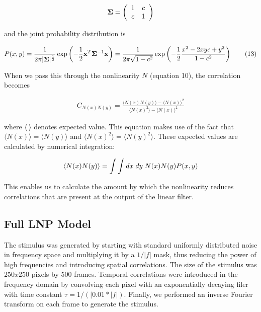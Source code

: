 \documentclass[12pt]{article}
\begin{document}
\[ {\bf\Sigma} = \left( \begin{array}{cc}
1 & c \\
c & 1 \\
\end{array} \right) \]

\noindent and the joint probability distribution is

\begin{align}
\displaystyle P(x,y) = \frac{1}{2\pi |{\bf \Sigma}|^{\frac{1}{2}}}\exp\left( -\frac{1}{2}{\bf x}^T {\bf \Sigma}^{-1} {\bf x}\right)=\frac{1}{2\pi \sqrt{1-c^2}}\exp\left( -\frac{1}{2}\frac{x^2-2xyc+y^2}{1-c^2}\right) \tag{13}
\end{align}

\noindent When we pass this through the nonlinearity $N$ (equation 10), the correlation becomes

\begin{align}
\displaystyle C_{N(x)N(y)} = \frac{\langle N(x)N(y)\rangle- \langle N(x)\rangle^2}{\langle N(x)^2 \rangle - \langle N(x) \rangle^2} \tag{12}
\end{align}

\noindent where $\langle \:\rangle$ denotes expected value. This equation makes use of the fact that $\langle N(x) \rangle = \langle N(y) \rangle$ and $\langle N(x)^2 \rangle = \langle N(y)^2 \rangle$. These expected values are calculated by numerical integration:

\begin{align}
\langle N(x)N(y) \rangle = \int \int dx\;dy\;N(x)N(y)P(x,y) \notag
\end{align}

\noindent This enables us to calculate the amount by which the nonlinearity reduces correlations that are present at the output of the linear filter.

\subsection{Full LNP Model}
The stimulus was generated by starting with standard uniformly distributed noise in frequency space and multiplying it by a $1/|f|$ mask, thus reducing the power of high frequencies and introducing spatial correlations. The size of the stimulus was $250x250$ pixels by 500 frames. Temporal correlations were introduced in the frequency domain by convolving each pixel with an exponentially decaying filer with time constant $\tau = 1/(|0.01*|f|)$. Finally, we performed an inverse Fourier transform on each frame to generate the stimulus.
\end{document}
